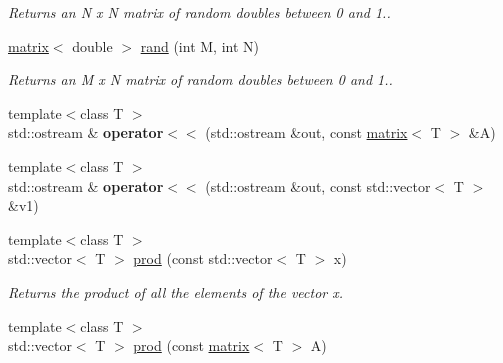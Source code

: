 \begin{DoxyCompactItemize}
\begin{DoxyCompactList}\small\item\em Returns an N x N matrix of random doubles between 0 and 1.. \end{DoxyCompactList}\item 
\hypertarget{namespacekeycpp_adbc446e99edbcde1d69bfe2c74dc3c80}{\hyperlink{classkeycpp_1_1matrix}{matrix}$<$ double $>$ \hyperlink{namespacekeycpp_adbc446e99edbcde1d69bfe2c74dc3c80}{rand} (int M, int N)}\label{namespacekeycpp_adbc446e99edbcde1d69bfe2c74dc3c80}

\begin{DoxyCompactList}\small\item\em Returns an M x N matrix of random doubles between 0 and 1.. \end{DoxyCompactList}\item 
\hypertarget{namespacekeycpp_a55e8bada51586c0561e1b32ca1ab5f2a}{{\footnotesize template$<$class T $>$ }\\std\-::ostream \& {\bfseries operator$<$$<$} (std\-::ostream \&out, const \hyperlink{classkeycpp_1_1matrix}{matrix}$<$ T $>$ \&A)}\label{namespacekeycpp_a55e8bada51586c0561e1b32ca1ab5f2a}

\item 
\hypertarget{namespacekeycpp_a300d8f6e8992c7b33156492d884bd621}{{\footnotesize template$<$class T $>$ }\\std\-::ostream \& {\bfseries operator$<$$<$} (std\-::ostream \&out, const std\-::vector$<$ T $>$ \&v1)}\label{namespacekeycpp_a300d8f6e8992c7b33156492d884bd621}

\item 
\hypertarget{namespacekeycpp_a18c262cc7b63b53f3d4c9fbeda591088}{{\footnotesize template$<$class T $>$ }\\std\-::vector$<$ T $>$ \hyperlink{namespacekeycpp_a18c262cc7b63b53f3d4c9fbeda591088}{prod} (const std\-::vector$<$ T $>$ x)}\label{namespacekeycpp_a18c262cc7b63b53f3d4c9fbeda591088}

\begin{DoxyCompactList}\small\item\em Returns the product of all the elements of the vector x. \end{DoxyCompactList}\item 
\hypertarget{namespacekeycpp_a0b348cee175715d20a1997b471c47d7a}{{\footnotesize template$<$class T $>$ }\\std\-::vector$<$ T $>$ \hyperlink{namespacekeycpp_a0b348cee175715d20a1997b471c47d7a}{prod} (const \hyperlink{classkeycpp_1_1matrix}{matrix}$<$ T $>$ A)}\label{namespacekeycpp_a0b348cee175715d20a1997b471c47d7a}


\end{DoxyCompactItemize}

